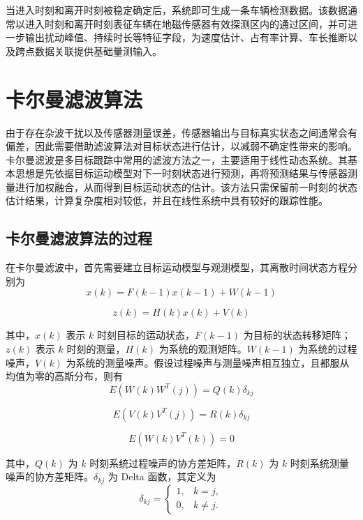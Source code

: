 \documentclass{xdupgthesis}
\begin{document}
当进入时刻和离开时刻被稳定确定后，系统即可生成一条车辆检测数据。该数据通常以进入时刻和离开时刻表征车辆在地磁传感器有效探测区内的通过区间，并可进一步输出扰动峰值、持续时长等特征字段，为速度估计、占有率计算、车长推断以及跨点数据关联提供基础量测输入\cite{balid2018intelligent}。


\section{卡尔曼滤波算法}

由于存在杂波干扰以及传感器测量误差，传感器输出与目标真实状态之间通常会有偏差，因此需要借助滤波算法对目标状态进行估计，以减弱不确定性带来的影响。卡尔曼滤波是多目标跟踪中常用的滤波方法之一，主要适用于线性动态系统。其基本思想是先依据目标运动模型对下一时刻状态进行预测，再将预测结果与传感器测量进行加权融合，从而得到目标运动状态的估计。该方法只需保留前一时刻的状态估计结果，计算复杂度相对较低，并且在线性系统中具有较好的跟踪性能。

\subsection{卡尔曼滤波算法的过程}

在卡尔曼滤波中，首先需要建立目标运动模型与观测模型，其离散时间状态方程分别为
\begin{equation}
	x(k)=F(k-1)x(k-1)+W(k-1)
\end{equation}

\begin{equation}
	z(k)=H(k)x(k)+V(k)
\end{equation}

其中，$x(k)$ 表示 $k$ 时刻目标的运动状态，$F(k-1)$ 为目标的状态转移矩阵；$z(k)$ 表示 $k$ 时刻的测量，$H(k)$ 为系统的观测矩阵。$W(k-1)$ 为系统的过程噪声，$V(k)$ 为系统的测量噪声。假设过程噪声与测量噪声相互独立，且都服从均值为零的高斯分布，则有
\begin{equation}
	E\!\left(W(k)W^{T}(j)\right)=Q(k)\delta_{kj}
\end{equation}

\begin{equation}
	E\!\left(V(k)V^{T}(j)\right)=R(k)\delta_{kj}
\end{equation}

\begin{equation}
	E\!\left(W(k)V^{T}(k)\right)=0
\end{equation}

其中，$Q(k)$ 为 $k$ 时刻系统过程噪声的协方差矩阵，$R(k)$ 为 $k$ 时刻系统测量噪声的协方差矩阵。$\delta_{kj}$ 为 Delta 函数，其定义为
\begin{equation}
	\delta_{kj}=
	\begin{cases}
		1, & k=j,\\
		0, & k\neq j.
	\end{cases}
\end{equation}
\end{document}
